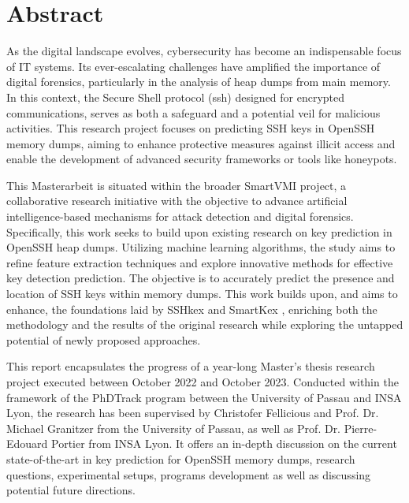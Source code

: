 \documentclass[11pt]{article} %
\title{\thetitle}
\author{\theauthor}
\date{April-Mai 2023}
\begin{document}

\newpage


\section*{Abstract}
As the digital landscape evolves, cybersecurity has become an indispensable focus of IT systems. Its ever-escalating challenges have amplified the importance of digital forensics, particularly in the analysis of heap dumps from main memory. In this context, the Secure Shell protocol (\acrshort{ssh}) designed for encrypted communications, serves as both a safeguard and a potential veil for malicious activities. This research project focuses on predicting SSH keys in OpenSSH memory dumps, aiming to enhance protective measures against illicit access and enable the development of advanced security frameworks or tools like honeypots. 

This Masterarbeit is situated within the broader SmartVMI project, a collaborative research initiative with the objective to advance artificial intelligence-based mechanisms for attack detection and digital forensics. Specifically, this work seeks to build upon existing research on key prediction in OpenSSH heap dumps. Utilizing machine learning algorithms, the study aims to refine feature extraction techniques and explore innovative methods for effective key detection prediction. The objective is to accurately predict the presence and location of SSH keys within memory dumps. This work builds upon, and aims to enhance, the foundations laid by SSHkex \cite{SSHkex22} and SmartKex \cite{SmartKex22}, enriching both the methodology and the results of the original research while exploring the untapped potential of newly proposed approaches.

This report encapsulates the progress of a year-long Master's thesis research project executed between October 2022 and October 2023. Conducted within the framework of the PhDTrack program between the University of Passau and INSA Lyon, the research has been supervised by Christofer Fellicious and Prof. Dr. Michael Granitzer from the University of Passau, as well as Prof. Dr. Pierre-Edouard Portier from INSA Lyon. It offers an in-depth discussion on the current state-of-the-art in key prediction for OpenSSH memory dumps, research questions, experimental setups, programs development as well as discussing potential future directions.
\end{document}
